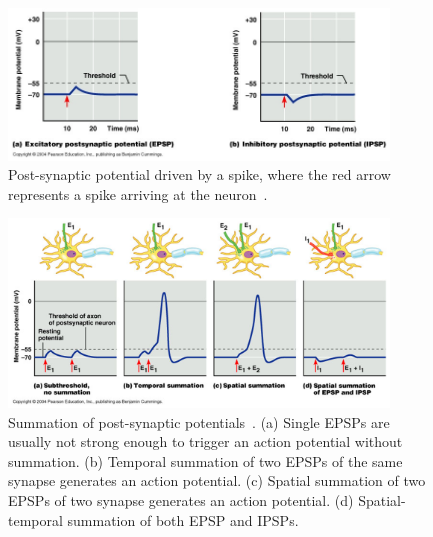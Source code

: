 
\begin{figure}[tb!]
	\centering
	\includegraphics[width=0.9\textwidth]{pics_snn/EI_PSP.JPG}
	\caption{Post-synaptic potential driven by a spike, where the red arrow represents a spike arriving at the neuron~\cite{marieb2007human}.}
	\label{Fig:psp}
\end{figure}

\begin{figure}[bt!]
	\centering
	\includegraphics[width=0.9\textwidth]{pics_snn/psp.png}
	\caption{Summation of post-synaptic potentials~\cite{reece2011campbell}. 
		(a) Single EPSPs are usually not strong enough to trigger an action potential without summation. (b) Temporal summation of two EPSPs of the same synapse generates an action potential. (c) Spatial summation of two EPSPs of two synapse generates an action potential. (d) Spatial-temporal summation of both EPSP and IPSPs.
	}
	\label{Fig:psp_sum}
\end{figure}

